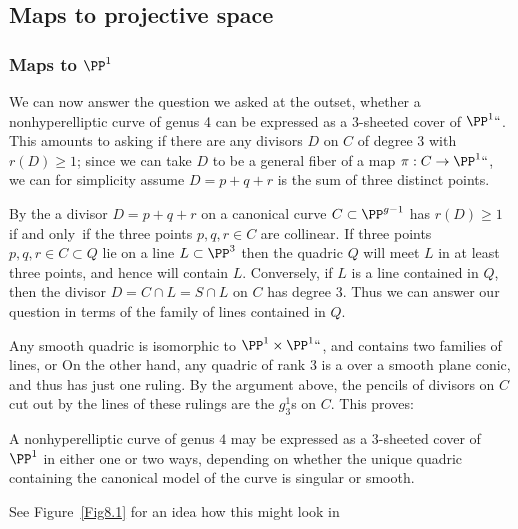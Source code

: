 \subsection*{Maps to projective space}

\subsubsection*{Maps to $\PP^1$}

We can now answer the question we asked at the outset, whether a
nonhyperelliptic curve of genus 4 can be expressed as a 3-sheeted
%
cover of $\PP^1` `$. This amounts to asking if there are any divisors
$D$ on $C$ of degree 3 with $r(D) \geq 1$; since we can take $D$ to be
a general fiber of a map $\pi : C \to \PP^1` `$, we can for simplicity
assume $D = p+q+r$ is the sum of three distinct points.

By the
%
a divisor $D = p+q+r$ on a canonical curve $C \subset \PP^{g-1}$ has
$r(D) \geq 1$ if and only~if the three points $p,q,r \in C$ are
collinear. If three points $p,q,r \in C \subset Q$ lie on a line $L
\subset \PP^3$ then the quadric $Q$ will meet $L$ in at least three
points, and hence will contain $L$. Conversely,  if $L$ is a line
contained in $Q$, then the divisor $D = C \cap L = S \cap L$ on $C$
has degree  3. Thus we can answer our question in terms of the family
of lines contained in $Q$.

Any smooth quadric is isomorphic to $\PP^1\times \PP^1` `$, and
contains two families of lines, or
%
On the other hand,
any  quadric of rank 3 is a
%
over a smooth plane conic, and thus
has just one ruling. By the argument above, the pencils of divisors on
$C$ cut out by the lines of these rulings are the $g^1_3$s on $C$.
This proves:

\begin{proposition}\label{genus 4 trigonal}
A nonhyperelliptic curve of genus $4$ may be expressed as a
$3$-sheeted cover of $\PP^1$ in either one or two ways, depending on
whether the unique quadric containing the canonical model of the curve
is singular or smooth.
\unif
\end{proposition}

See Figure~\ref{Fig8.1} for an idea how this might look in

